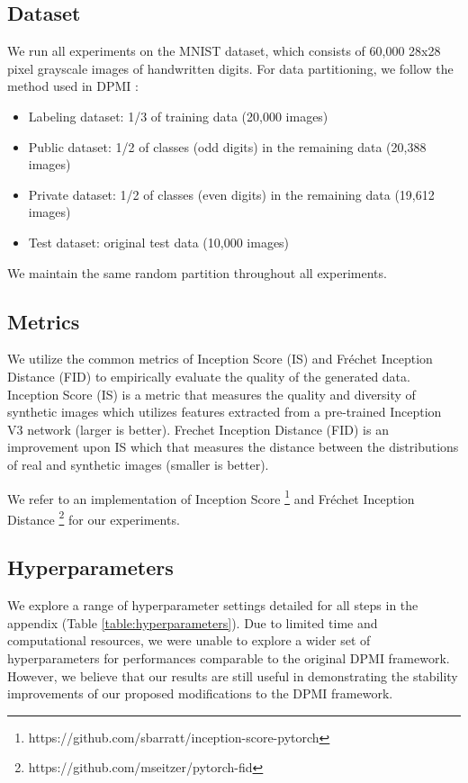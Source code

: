 \documentclass{article}
\begin{document}
\subsection{Dataset}
We run all experiments on the MNIST dataset, which consists of 60,000 28x28 pixel grayscale images of handwritten digits. For data partitioning, we follow the method used in DPMI \cite{dpmi}:
\begin{itemize}[noitemsep]
    \item Labeling dataset: 1/3 of training data (20,000 images)
    \item Public dataset: 1/2 of classes (odd digits) in the remaining data (20,388 images)
    \item Private dataset: 1/2 of classes (even digits) in the remaining data (19,612 images)
    \item Test dataset: original test data (10,000 images)
\end{itemize}
We maintain the same random partition throughout all experiments. 

\subsection{Metrics}
We utilize the common metrics of Inception Score (IS) \cite{IS} and Fréchet Inception Distance (FID) \cite{FID} to empirically evaluate the quality of the generated data. Inception Score (IS)\cite{IS} is a metric that measures the quality and diversity of synthetic images which utilizes features extracted from a pre-trained Inception V3 network (larger is better). Frechet Inception Distance (FID) \cite{FID} is an improvement upon IS which that measures the distance between the distributions of real and synthetic images (smaller is better).

We refer to an implementation of Inception Score \footnote{https://github.com/sbarratt/inception-score-pytorch} and Fréchet Inception Distance \footnote{https://github.com/mseitzer/pytorch-fid} for our experiments.





\subsection{Hyperparameters}
We explore a range of hyperparameter settings detailed for all steps in the appendix (Table \ref{table:hyperparameters}). Due to limited time and computational resources, we were unable to explore a wider set of hyperparameters for performances comparable to the original DPMI framework. However, we believe that our results are still useful in demonstrating the stability improvements of our proposed modifications to the DPMI framework.
\end{document}
